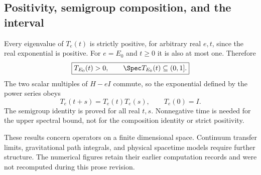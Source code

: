 \subsection{Positivity, semigroup composition, and the interval}
Every eigenvalue of $T_e(t)$ is strictly positive, for arbitrary real $e,t$, since the real exponential is positive. For $e=E_0$ and $t\ge0$ it is also at most one. Therefore
\[
\boxed{T_{E_0}(t)>0,\qquad \Spec T_{E_0}(t)\subseteq(0,1].}
\]
The two scalar multiples of $H-eI$ commute, so the exponential defined by the power series obeys
\[
\boxed{T_e(t+s)=T_e(t)T_e(s),\qquad T_e(0)=I.}
\]
The semigroup identity is proved for all real $t,s$. Nonnegative time is needed for the upper spectral bound, not for the composition identity or strict positivity.

These results concern operators on a finite dimensional space. Continuum transfer limits, gravitational path integrals, and physical spacetime models require further structure. The numerical figures retain their earlier computation records and were not recomputed during this prose revision.






